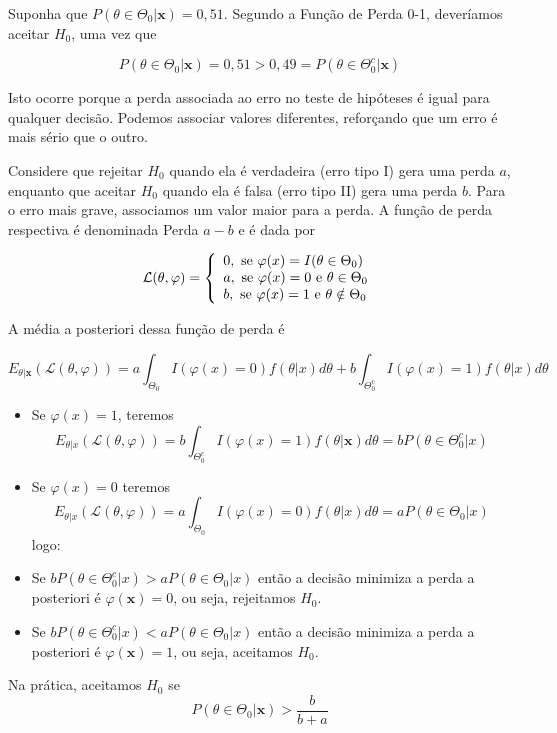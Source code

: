 \documentclass[
  letterpaper,
  DIV=11,
  numbers=noendperiod]{scrreprt}
\theoremstyle{definition}
\theoremstyle{plain}
\theoremstyle{definition}
\theoremstyle{remark}
\begin{document}
Suponha que \(P(\theta\in\Theta_0|\boldsymbol{x})=0,51\). Segundo a
Função de Perda 0-1, deveríamos aceitar \(H_0\), uma vez que

\[P(\theta\in\Theta_0|\boldsymbol{x})=0,51>0,49=P(\theta\in\Theta_0^c|\boldsymbol{x})\]

Isto ocorre porque a perda associada ao erro no teste de hipóteses é
igual para qualquer decisão. Podemos associar valores diferentes,
reforçando que um erro é mais sério que o outro.

Considere que rejeitar \(H_0\) quando ela é verdadeira (erro tipo I)
gera uma perda \(a\), enquanto que aceitar \(H_0\) quando ela é falsa
(erro tipo II) gera uma perda \(b\). Para o erro mais grave, associamos
um valor maior para a perda. A função de perda respectiva é denominada
Perda \(a-b\) e é dada por

\[\mathcal{L}(\theta,\varphi)=\left\{\begin{array}{l}0,\hbox{ se }\varphi(x)=I(\theta\in\Theta_0)\\
a,\hbox{ se }\varphi(x)=0\hbox{ e }\theta\in\Theta_0\\b,\hbox{ se }\varphi(x)=1\hbox{ e }\theta\notin\Theta_0\end{array}\right.\]

A média a posteriori dessa função de perda é

\[E_{\theta|\boldsymbol{x}}(\mathcal{L}(\theta,\varphi))=a\int_{\Theta_0}I(\varphi(x)=0)f(\theta|x)d\theta+b\int_{\Theta_0^c}I(\varphi(x)=1)f(\theta|x)d\theta\]

\begin{itemize}
\item
  Se \(\varphi(x)=1\), teremos
  \[E_{\theta|x}(\mathcal{L}(\theta,\varphi))=b\int_{\Theta_0^c}I(\varphi(x)=1)f(\theta|\boldsymbol{x})d\theta=bP(\theta\in\Theta_0^c|x)\]
\item
  Se \(\varphi(x)=0\) teremos
  \[E_{\theta|x}(\mathcal{L}(\theta,\varphi))=a\int_{\Theta_0}I(\varphi(x)=0)f(\theta|x)d\theta=aP(\theta\in\Theta_0|x)\]
  logo:
\item
  Se \(bP(\theta\in\Theta_0^c|x)>aP(\theta\in\Theta_0|x)\) então a
  decisão minimiza a perda a posteriori é \(\varphi(\boldsymbol{x})=0\),
  ou seja, rejeitamos \(H_0\).
\item
  Se \(bP(\theta\in\Theta_0^c|x)<aP(\theta\in\Theta_0|x)\) então a
  decisão minimiza a perda a posteriori é \(\varphi(\boldsymbol{x})=1\),
  ou seja, aceitamos \(H_0\).
\end{itemize}

Na prática, aceitamos \(H_0\) se
\[P(\theta\in\Theta_0|\boldsymbol{x})>\frac{b}{b+a}\]
\end{document}
